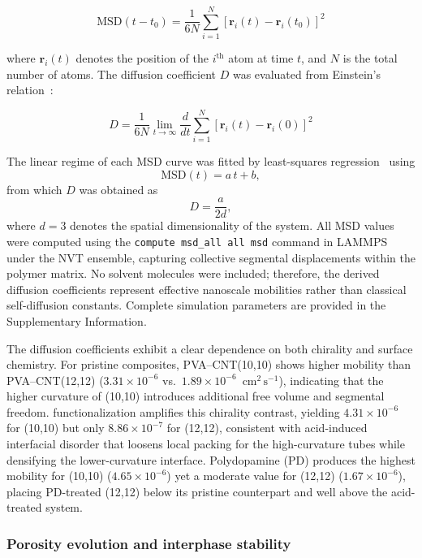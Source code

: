 \documentclass[journal=jacsat,manuscript=article]{achemso}
\begin{document}
{\[
\text{MSD}(t - t_0) = \frac{1}{6N} \sum_{i=1}^{N} \left[ \mathbf{r}_i(t) - \mathbf{r}_i(t_0) \right]^2 \tag{1}
\]

where $\mathbf{r}_i(t)$ denotes the position of the $i^{\text{th}}$ atom at time $t$, and $N$ is the total number of atoms. The diffusion coefficient $D$ was evaluated from Einstein’s relation~\cite{boyd1991molecular}:

\[
D = \frac{1}{6N} \lim_{t \to \infty} \frac{d}{dt} \sum_{i=1}^{N} \left[ \mathbf{r}_i(t) - \mathbf{r}_i(0) \right]^2 \tag{2}
\]

The linear regime of each MSD curve was fitted by least-squares regression~\cite{chipman1979efficiency} using
\[
\text{MSD}(t) = a\,t + b,
\]
from which $D$ was obtained as~
\[
D = \frac{a}{2d},
\]
where $d = 3$ denotes the spatial dimensionality of the system. All MSD values were computed using the \texttt{compute msd\_all all msd} command in LAMMPS under the NVT ensemble, capturing collective segmental displacements within the polymer matrix. No solvent molecules were included; therefore, the derived diffusion coefficients represent effective nanoscale mobilities rather than classical self-diffusion constants. Complete simulation parameters are provided in the Supplementary Information.

\medskip

The diffusion coefficients exhibit a clear dependence on both chirality and surface chemistry. For pristine composites, PVA--CNT(10,10) shows higher mobility than PVA--CNT(12,12) \big($3.31\times10^{-6}$ vs.\ $1.89\times10^{-6}$~\(\mathrm{cm^2\,s^{-1}}\)\big), indicating that the higher curvature of (10,10) introduces additional free volume and segmental freedom.  functionalization amplifies this chirality contrast, yielding $4.31\times10^{-6}$ for (10,10) but only $8.86\times10^{-7}$ for (12,12), consistent with acid-induced interfacial disorder that loosens local packing for the high-curvature tubes while densifying the lower-curvature interface. Polydopamine (PD) produces the highest mobility for (10,10) \big($4.65\times10^{-6}$\big) yet a moderate value for (12,12) \big($1.67\times10^{-6}$\big), placing PD-treated (12,12) below its pristine counterpart and well above the acid-treated system.



\subsubsection{Porosity evolution and interphase stability}

}
\end{document}
